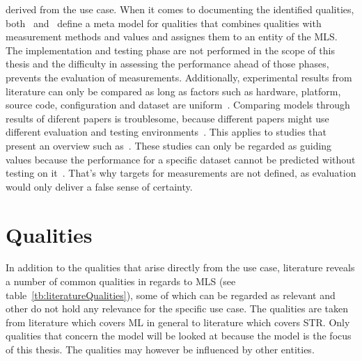 derived from the use case.
When it comes to documenting the identified qualities,
both~\cite{nakamichi_requirements-driven_2020} and~\cite{siebert_construction_2021} define a meta
model for qualities that combines qualities with
measurement methods and values and assignes them to an entity of the \ac{MLS}.
The implementation and testing phase are not performed in the scope of this thesis and the
difficulty in assessing the performance ahead of those phases, prevents the evaluation
of measurements.
Additionally, experimental results from literature can only be compared as long as factors such as
hardware, platform, source code, configuration and dataset are uniform~\citep{arpteg_software_2018}.
Comparing models through results of diferent papers is troublesome, because different papers
might use different evaluation and testing environments~\citep{baek_what_2019}.
This applies to studies that present an overview such as~\cite{chen_text_2021,long_scene_2021}.
These studies can only be regarded as guiding values because the performance for a specific dataset
cannot be predicted without testing on it~\cite{arpteg_software_2018}.
That's why targets for measurements are not defined, as evaluation would only deliver a false
sense of certainty.


\section{Qualities}
In addition to the qualities that arise directly from the use case, literature reveals a number of
common qualities in regards to \ac{MLS} (see table~\ref{tb:literatureQualities}), some of which
can be regarded as relevant and other do not hold any relevance for the specific use case.
The qualities are taken from literature which covers \ac{ML} in general to literature
which covers \ac{STR}.
Only qualities that concern the model will be looked at because the model is the focus of this thesis.
The qualities may however be influenced by other entities.


